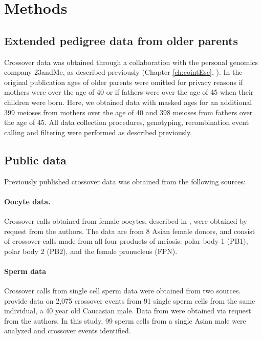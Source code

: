 \section{Methods}

\subsection{Extended pedigree data from older parents}
Crossover data was obtained through a collaboration with the personal genomics company 23andMe, as described previously (Chapter \ref{ch:cointEsc}, \citet{Campbell2015}).
In the original publication ages of older parents were omitted for privacy reasons if mothers were over the age of 40 or if fathers were over the age of 45 when their children were born.
Here, we obtained data with masked ages for an additional 399 meioses from mothers over the age of 40 and 398 meioses from fathers over the age of 45.
All data collection procedures, genotyping, recombination event calling and filtering were performed as described previously.

\subsection{Public data}
Previously published crossover data was obtained from the following sources:

\paragraph{Oocyte data.}
Crossover calls obtained from female oocytes, described in \citet{Hou2013}, were obtained by request from the authors.
The data are from 8 Asian female donors, and consist of crossover calls made from all four products of meiosis: polar body 1 (PB1), polar body 2 (PB2), and the female pronucleus (FPN).

\paragraph{Sperm data}
Crossover calls from single cell sperm data were obtained from two sources.
%
\citet{Wang2012} provide data on 2,075 crossover events from 91 single sperm cells from the same individual, a 40 year old Caucasian male.
%
Data from \citet{Lu2012} were obtained via request from the authors.
In this study, 99 sperm cells from a single Asian male were analyzed and crossover events identified.

